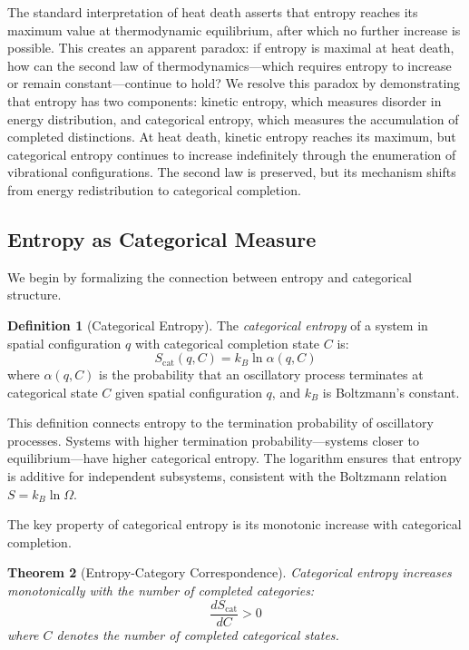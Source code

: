 \documentclass[12pt,a4paper]{article}
\newtheorem{theorem}{Theorem}[section]
\theoremstyle{definition}
\newtheorem{definition}[theorem]{Definition}
\theoremstyle{remark}
\begin{document}
The standard interpretation of heat death asserts that entropy reaches its maximum value at thermodynamic equilibrium, after which no further increase is possible. This creates an apparent paradox: if entropy is maximal at heat death, how can the second law of thermodynamics—which requires entropy to increase or remain constant—continue to hold? We resolve this paradox by demonstrating that entropy has two components: kinetic entropy, which measures disorder in energy distribution, and categorical entropy, which measures the accumulation of completed distinctions. At heat death, kinetic entropy reaches its maximum, but categorical entropy continues to increase indefinitely through the enumeration of vibrational configurations. The second law is preserved, but its mechanism shifts from energy redistribution to categorical completion.

\subsection{Entropy as Categorical Measure}

We begin by formalizing the connection between entropy and categorical structure.

\begin{definition}[Categorical Entropy]
\label{def:categorical_entropy}
The \emph{categorical entropy} of a system in spatial configuration $q$ with categorical completion state $C$ is:
\begin{equation}
S_{\text{cat}}(q, C) = k_B \ln \alpha(q, C)
\end{equation}
where $\alpha(q, C)$ is the probability that an oscillatory process terminates at categorical state $C$ given spatial configuration $q$, and $k_B$ is Boltzmann's constant.
\end{definition}

This definition connects entropy to the termination probability of oscillatory processes. Systems with higher termination probability—systems closer to equilibrium—have higher categorical entropy. The logarithm ensures that entropy is additive for independent subsystems, consistent with the Boltzmann relation $S = k_B \ln \Omega$.

The key property of categorical entropy is its monotonic increase with categorical completion.

\begin{theorem}[Entropy-Category Correspondence]
\label{thm:entropy_category}
Categorical entropy increases monotonically with the number of completed categories:
\begin{equation}
\frac{dS_{\text{cat}}}{dC} > 0
\end{equation}
where $C$ denotes the number of completed categorical states.
\end{theorem}
\end{document}
